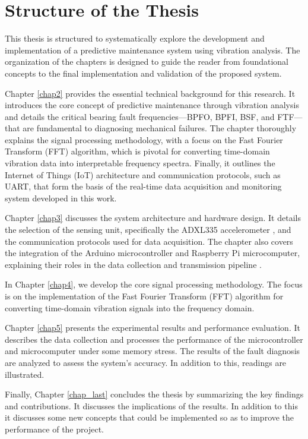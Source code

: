 \section{Structure of the Thesis}

{

This thesis is structured to systematically explore the development and implementation of a predictive maintenance system using vibration analysis. The organization of the chapters is designed to guide the reader from foundational concepts to the final implementation and validation of the proposed system.

Chapter \ref{chap2} provides the essential technical background for this research. It introduces the core concept of predictive maintenance through vibration analysis and details the critical bearing fault frequencies—BPFO, BPFI, BSF, and FTF—that are fundamental to diagnosing mechanical failures. The chapter thoroughly explains the signal processing methodology, with a focus on the Fast Fourier Transform (FFT) algorithm, which is pivotal for converting time-domain vibration data into interpretable frequency spectra. Finally, it outlines the Internet of Things (IoT) architecture and communication protocols, such as UART, that form the basis of the real-time data acquisition and monitoring system developed in this work.

Chapter \ref{chap3} discusses the system architecture and hardware design. It details the selection of the sensing unit, specifically the ADXL335 accelerometer \cite{ADXL335}, and the communication protocols used for data acquisition. The chapter also covers the integration of the Arduino microcontroller and Raspberry Pi microcomputer, explaining their roles in the data collection and transmission pipeline \cite{ArduinoAnalogInput, Ali2004}.

In Chapter \ref{chap4}, we develop the core signal processing methodology. The focus is on the implementation of the Fast Fourier Transform (FFT) algorithm \cite{CooleyTukey1965, Singeleton1967} for converting time-domain vibration signals into the frequency domain.

Chapter \ref{chap5} presents the experimental results and performance evaluation. It describes the data collection and processes the performance of the microcontroller and microcomputer under some memory stress. The results of the fault diagnosis are analyzed to assess the system's accuracy. In addition to this, readings are illustrated.

Finally, Chapter \ref{chap_last} concludes the thesis by summarizing the key findings and contributions. It discusses the implications of the results. In addition to this it discusses some new concepts that could be implemented so as to improve the performance of the project.
}

